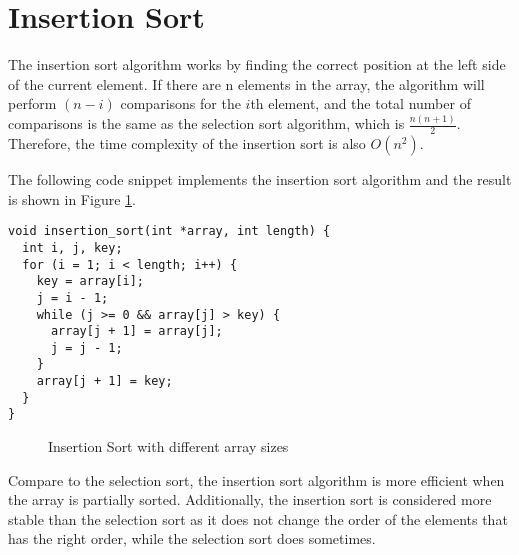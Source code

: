 \documentclass[a4paper,11pt]{article}
\begin{document}
\section*{Insertion Sort}

The insertion sort algorithm works by finding the correct position at the left 
side of the current element. If there are n elements in the array, the algorithm
will perform $(n-i)$ comparisons for the $i$th element, and the total number of
comparisons is the same as the selection sort algorithm, which is $\frac{n(n+1)}{2}$.
Therefore, the time complexity of the insertion sort is also $O(n^2)$.

The following code snippet implements the insertion sort algorithm and the result
is shown in Figure \ref{fig:insertion-sort}.

\begin{verbatim}
void insertion_sort(int *array, int length) {
  int i, j, key;
  for (i = 1; i < length; i++) {
    key = array[i];
    j = i - 1;
    while (j >= 0 && array[j] > key) {
      array[j + 1] = array[j];
      j = j - 1;
    }
    array[j + 1] = key;
  }
}
\end{verbatim}
  
\begin{figure}[H]
  \centering
  \caption{Insertion Sort with different array sizes}
  \label{fig:insertion-sort}
\end{figure}

Compare to the selection sort, the insertion sort algorithm is more efficient
when the array is partially sorted. Additionally, the insertion sort is considered
more stable than the selection sort as it does not change the order of the elements
that has the right order, while the selection sort does sometimes.
\end{document}
